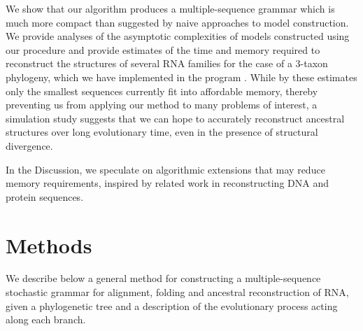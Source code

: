 \documentclass[10pt]{article}
\begin{document}
We show that our algorithm produces a multiple-sequence grammar which is
much more compact than suggested by naive approaches to model
construction.  We provide analyses of the asymptotic complexities of
models constructed using our procedure and provide estimates of the
time and memory required to reconstruct the structures of several RNA
families for the case of a 3-taxon phylogeny, which we have
implemented in the program \indiegram. While by these estimates only
the smallest sequences currently fit into affordable memory, thereby
preventing us from applying our method to many problems of interest,
a simulation study suggests that we can hope to accurately reconstruct
ancestral structures over long evolutionary time, even in the presence
of structural divergence.

In the Discussion, we speculate on algorithmic extensions that
may reduce memory requirements, inspired by related work in
reconstructing DNA and protein sequences.



\newpage
\section*{Methods}
We describe below a general method for constructing a multiple-sequence
stochastic grammar for alignment, folding and ancestral reconstruction of RNA,
given a phylogenetic tree and a description of the evolutionary
process acting along each branch.

% 
\end{document}
